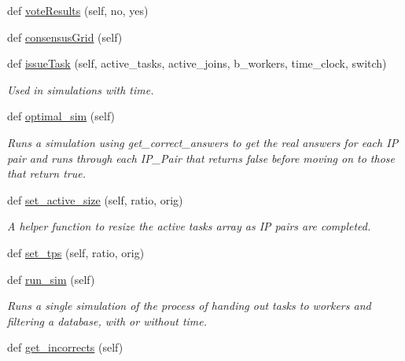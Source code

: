 \begin{DoxyCompactItemize}
def \mbox{\hyperlink{classdynamicfilterapp_1_1test__simulations_1_1_simulation_test_a042330aaf0a341a79e80194c2637c1ef}{vote\+Results}} (self, no, yes)
\item 
def \mbox{\hyperlink{classdynamicfilterapp_1_1test__simulations_1_1_simulation_test_ace5df674cddd1b8f77748b585a69feb9}{consensus\+Grid}} (self)
\item 
def \mbox{\hyperlink{classdynamicfilterapp_1_1test__simulations_1_1_simulation_test_a1053a9c96fb2665adc869c558b818a47}{issue\+Task}} (self, active\+\_\+tasks, active\+\_\+joins, b\+\_\+workers, time\+\_\+clock, switch)
\begin{DoxyCompactList}\small\item\em Used in simulations with time. \end{DoxyCompactList}\item 
def \mbox{\hyperlink{classdynamicfilterapp_1_1test__simulations_1_1_simulation_test_a3485447162eb85b9d98dd4ebd84c6e50}{optimal\+\_\+sim}} (self)
\begin{DoxyCompactList}\small\item\em Runs a simulation using get\+\_\+correct\+\_\+answers to get the real answers for each IP pair and runs through each I\+P\+\_\+\+Pair that returns false before moving on to those that return true. \end{DoxyCompactList}\item 
def \mbox{\hyperlink{classdynamicfilterapp_1_1test__simulations_1_1_simulation_test_a966a3c31662ba0c8c2d3d095899ec1ad}{set\+\_\+active\+\_\+size}} (self, ratio, orig)
\begin{DoxyCompactList}\small\item\em A helper function to resize the active tasks array as IP pairs are completed. \end{DoxyCompactList}\item 
def \mbox{\hyperlink{classdynamicfilterapp_1_1test__simulations_1_1_simulation_test_aad2d8e9dd7aa97a8929ef0f348af5f52}{set\+\_\+tps}} (self, ratio, orig)
\item 
def \mbox{\hyperlink{classdynamicfilterapp_1_1test__simulations_1_1_simulation_test_aafbc405f49645141a30302a448b056dc}{run\+\_\+sim}} (self)
\begin{DoxyCompactList}\small\item\em Runs a single simulation of the process of handing out tasks to workers and filtering a database, with or without time. \end{DoxyCompactList}\item 
def \mbox{\hyperlink{classdynamicfilterapp_1_1test__simulations_1_1_simulation_test_a9adfa8688f12473b0c394cd3b7237be0}{get\+\_\+incorrects}} (self)

\end{DoxyCompactItemize}
